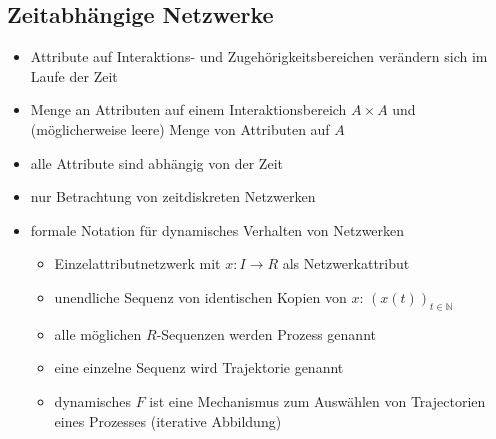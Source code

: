 \subsection{Zeitabhängige Netzwerke}
	\begin{itemize}
		\item Attribute auf Interaktions- und Zugehörigkeitsbereichen verändern sich im Laufe der Zeit
		\item Menge an Attributen auf einem Interaktionsbereich $A\times A$ und (möglicherweise leere) Menge von Attributen auf $A$
		\item alle Attribute sind abhängig von der Zeit
		\item nur Betrachtung von zeitdiskreten Netzwerken
		\item formale Notation für dynamisches Verhalten von Netzwerken
			\begin{itemize}
				\item Einzelattributnetzwerk mit $x:I\rightarrow R$ als Netzwerkattribut
				\item unendliche Sequenz von identischen Kopien von $x$: $(x(t))_{t\in \mathbb{N}}$
				\item alle möglichen $R$-Sequenzen werden Prozess genannt
				\item eine einzelne Sequenz wird Trajektorie genannt
				\item dynamisches $F$ ist eine Mechanismus zum Auswählen von Trajectorien eines Prozesses (iterative Abbildung)
			\end{itemize}
	\end{itemize}
